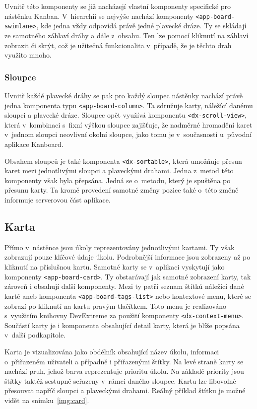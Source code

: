 Uvnitř této komponenty se již nacházejí vlastní komponenty specifické pro nástěnku Kanban. V~hiearchii se nejvýše nachází komponenty \texttt{<app-board-swimlane>}, kde jedna vždy odpovídá právě jedné plavecké dráze. Ty se skládají ze samotného záhlaví dráhy a dále z~obsahu. Ten lze pomocí kliknutí na záhlaví zobrazit či skrýt, což je užitečná funkcionalita v~případě, že je těchto drah využito mnoho. 

\subsubsection*{Sloupce}

Uvnitř každé plavecké dráhy se pak pro každý sloupec nástěnky nachází právě jedna komponenta typu \texttt{<app-board-column>}. Ta sdružuje karty, náležící danému sloupci a plavecké dráze. Sloupec opět využívá komponentu \texttt{<dx-scroll-view>}, která v~kombinaci s~fixní výškou sloupce zajišťuje, že nadměrné hromadění karet v~jednom sloupci neovlivní okolní sloupce, jako tomu je v~současnosti u~původní aplikace Kanboard.

Obsahem sloupců je také komponenta \texttt{<dx-sortable>}, která umožňuje přesun karet mezi jednotlivými sloupci a plaveckými drahami. Jedna z~metod této komponenty však byla přepsána. Jedná se o~metodu, který je spuštěna po přesunu karty. Ta kromě provedení samotné změny pozice také o~této změně informuje serverovou část aplikace. 

\subsection{Karta}
Přímo v~nástěnce jsou úkoly reprezentovány jednotlivými kartami. Ty však zobrazují pouze klíčové údaje úkolu. Podrobnější informace jsou zobrazeny až po kliknutí na příslušnou kartu. Samotné karty se v~aplikaci vyskytují jako komponenty \texttt{<app-board-card>}. Ty obstarávají jak samotné zobrazení karty, tak zároveň i obsahují další komponenty. Mezi ty patří seznam štítků náležící dané kartě aneb komponenta \texttt{<app-board-tags-list>} nebo kontextové menu, které se zobrazí po kliknutí na kartu pravým tlačítkem. Toto menu je realizováno s~využitím knihovny DevExtreme za použití komponenty \texttt{<dx-context-menu>}. Součástí karty je i komponenta obsahující detail karty, která je blíže popsána v~další podkapitole.

Karta je vizualizována jako obdélník obsahující název úkolu, informaci o~přiřazeném uživateli a případně i přiřazenými štítky. Na levé straně karty se nachází pruh, jehož barva reprezentuje prioritu úkolu. Na základě priority jsou štítky taktéž sestupně seřazeny v~rámci daného sloupce. Kartu lze libovolně přesouvat napříč sloupci a plaveckými drahami. Reálný příklad štítku je možné vidět na snímku~\ref{img:card}.

